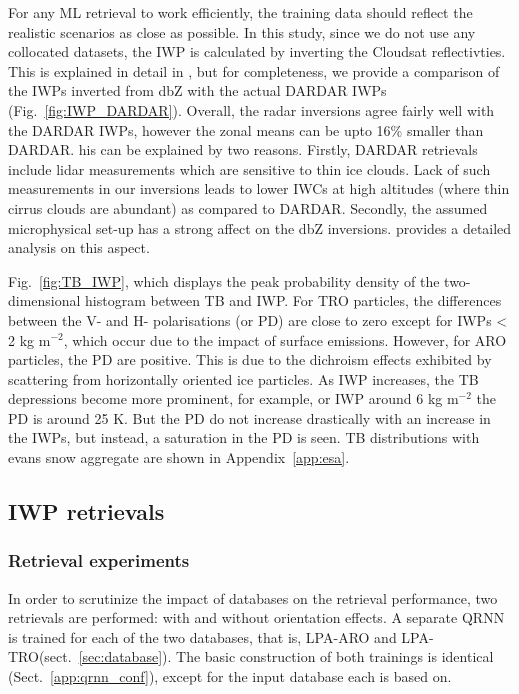 \documentclass[amt, manuscript]{copernicus}
\begin{document}
For any ML retrieval to work efficiently, the training data should reflect the realistic scenarios as close as possible. In this study, since we do not use any collocated datasets, the IWP is calculated by inverting the Cloudsat reflectivties. This is explained in detail in \citet{ekelund2020using}, but for completeness, we provide a comparison of the IWPs inverted from dbZ with the actual DARDAR IWPs (Fig.~\ref{fig:IWP_DARDAR}). Overall, the radar inversions agree
fairly well with the DARDAR IWPs, however the zonal means can be upto 16\% smaller than DARDAR.  his can be explained by two reasons. Firstly, DARDAR retrievals include lidar measurements which are sensitive to thin ice clouds. Lack of such measurements in our inversions leads to lower IWCs at high altitudes (where thin cirrus clouds are abundant) as compared to DARDAR. Secondly, the assumed microphysical set-up has a strong affect on the dbZ inversions. \citet{ekelund2020using} provides a detailed analysis on this aspect.

Fig.~\ref{fig:TB_IWP}, which displays the peak probability density of the two-dimensional histogram between TB and IWP. For TRO particles, the differences between the V- and H- polarisations (or PD) are close to zero except for IWPs < 2\,\,kg m$^{-2}$, which occur due to the impact of surface emissions. However, for ARO particles, the PD are positive. This is due to the dichroism effects exhibited by scattering from horizontally oriented ice particles. As IWP increases, the TB depressions become more prominent, for example, or IWP around 6\,\,kg m$^{-2}$ the PD is around 25\,\,K. But the PD do not increase drastically with an increase in the IWPs, but instead, a saturation in the PD is seen. TB distributions with evans snow aggregate are shown in Appendix~\ref{app:esa}.

\subsection{IWP retrievals}
%
\label{sec:iwp_retrievals}

\subsubsection{Retrieval experiments}
%
In order to scrutinize the impact of databases on the retrieval performance, two retrievals are performed: with and without orientation effects. A separate QRNN is trained for each of the two databases, that is, LPA-ARO and LPA-TRO(sect.~\ref{sec:database}). The basic construction of both trainings is identical (Sect.~\ref{app:qrnn_conf}), except for the input database each is based on. 
\end{document}
